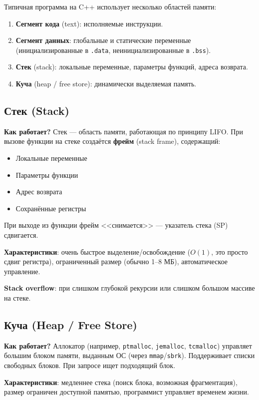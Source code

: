 \documentclass[12pt,a4paper]{article}
\begin{document}
Типичная программа на C++ использует несколько областей памяти:
\begin{enumerate}
    \item \textbf{Сегмент кода} (text): исполняемые инструкции.
    \item \textbf{Сегмент данных}: глобальные и статические переменные (инициализированные в \texttt{.data}, неинициализированные в \texttt{.bss}).
    \item \textbf{Стек} (stack): локальные переменные, параметры функций, адреса возврата.
    \item \textbf{Куча} (heap / free store): динамически выделяемая память.
\end{enumerate}

\subsection{Стек (Stack)}

\textbf{Как работает?} Стек --- область памяти, работающая по принципу LIFO. При вызове функции на стеке создаётся \textbf{фрейм} (stack frame), содержащий:
\begin{itemize}
    \item Локальные переменные
    \item Параметры функции
    \item Адрес возврата
    \item Сохранённые регистры
\end{itemize}

При выходе из функции фрейм <<снимается>> --- указатель стека (SP) сдвигается.

\textbf{Характеристики}: очень быстрое выделение/освобождение ($O(1)$, это просто сдвиг регистра), ограниченный размер (обычно 1--8 МБ), автоматическое управление.

\textbf{Stack overflow}: при слишком глубокой рекурсии или слишком большом массиве на стеке.

\subsection{Куча (Heap / Free Store)}

\textbf{Как работает?} Аллокатор (например, \texttt{ptmalloc}, \texttt{jemalloc}, \texttt{tcmalloc}) управляет большим блоком памяти, выданным ОС (через \texttt{mmap}/\texttt{sbrk}). Поддерживает списки свободных блоков. При запросе ищет подходящий блок.

\textbf{Характеристики}: медленнее стека (поиск блока, возможная фрагментация), размер ограничен доступной памятью, программист управляет временем жизни.
\end{document}
